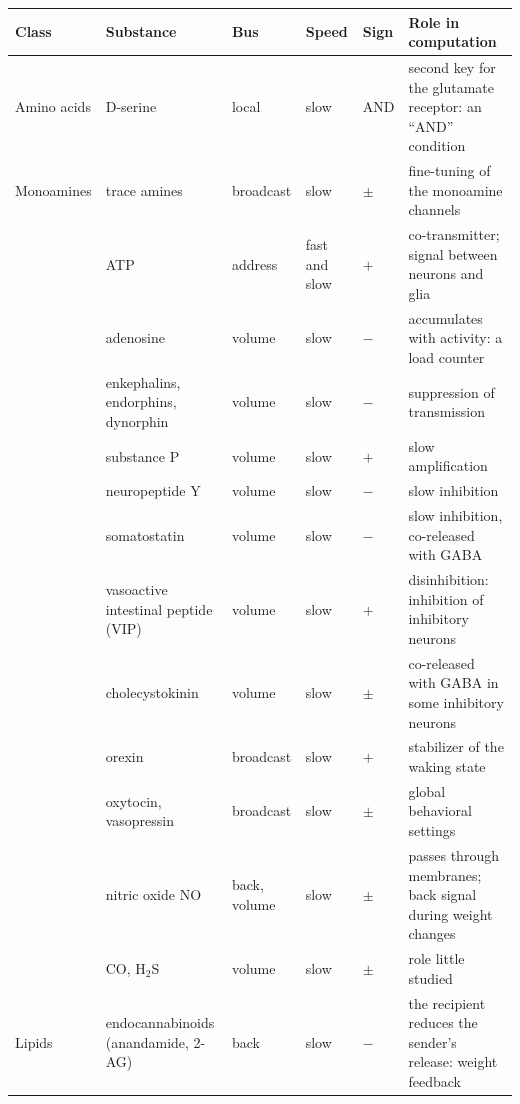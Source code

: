 \begin{table}[t]
\centering
\footnotesize
\setlength{\tabcolsep}{4pt}
\renewcommand{\arraystretch}{1.12}
\begin{tabular}{>{\raggedright}p{2.25cm}>{\raggedright}p{2.8cm}>{\raggedright}p{1.8cm}>{\raggedright}p{1.5cm}>{\centering}p{0.8cm}>{\raggedright\arraybackslash}p{4.3cm}}
\toprule
Class & Substance & Bus & Speed & Sign & Role in computation \\
\midrule
Amino acids & D-serine & local & slow & AND & second key for the glutamate receptor: an ``AND'' condition \\
\midrule
Monoamines & trace amines & broadcast & slow & $\pm$ & fine-tuning of the monoamine channels \\
\midrule
\multirow{2}{2.25cm}{Purines}
 & ATP & address & fast and slow & $+$ & co-transmitter; signal between neurons and glia \\
 & adenosine & volume & slow & $-$ & accumulates with activity: a load counter~\cite{Dunwiddie2001} \\
\midrule
\multirow{8}{2.25cm}{Neuropeptides (more than a hundred)}
 & enkephalins, endorphins, dynorphin & volume & slow & $-$ & suppression of transmission \\
 & substance P & volume & slow & $+$ & slow amplification \\
 & neuropeptide Y & volume & slow & $-$ & slow inhibition \\
 & somatostatin & volume & slow & $-$ & slow inhibition, co-released with GABA \\
 & vasoactive intestinal peptide (VIP) & volume & slow & $+$ & disinhibition: inhibition of inhibitory neurons \\
 & cholecystokinin & volume & slow & $\pm$ & co-released with GABA in some inhibitory neurons \\
 & orexin & broadcast & slow & $+$ & stabilizer of the waking state \\
 & oxytocin, vasopressin & broadcast & slow & $\pm$ & global behavioral settings \\
\midrule
\multirow{2}{2.25cm}{Gases}
 & nitric oxide NO & back, volume & slow & $\pm$ & passes through membranes; back signal during weight changes~\cite{Garthwaite2008} \\
 & CO, H$_2$S & volume & slow & $\pm$ & role little studied \\
\midrule
Lipids & endocannabinoids (anandamide, 2-AG) & back & slow & $-$ & the recipient reduces the sender's release: weight feedback~\cite{WilsonNicoll2001} \\

\end{tabular}
\end{table}
